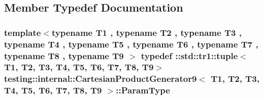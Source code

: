 \subsection{Member Typedef Documentation}
\hypertarget{classtesting_1_1internal_1_1CartesianProductGenerator9_a333de873be0c11965024ad94d5e958d9}{
\subsubsection[{Param\-Type}]{\setlength{\rightskip}{0pt plus 5cm}template$<$typename T1 , typename T2 , typename T3 , typename T4 , typename T5 , typename T6 , typename T7 , typename T8 , typename T9 $>$ typedef \-::{\bf std\-::tr1\-::tuple}$<$T1, T2, T3, T4, T5, T6, T7, T8, T9$>$ {\bf testing\-::internal\-::\-Cartesian\-Product\-Generator9}$<$ T1, T2, T3, T4, T5, T6, T7, T8, T9 $>$\-::{\bf Param\-Type}}}\label{classtesting_1_1internal_1_1CartesianProductGenerator9_a333de873be0c11965024ad94d5e958d9}


